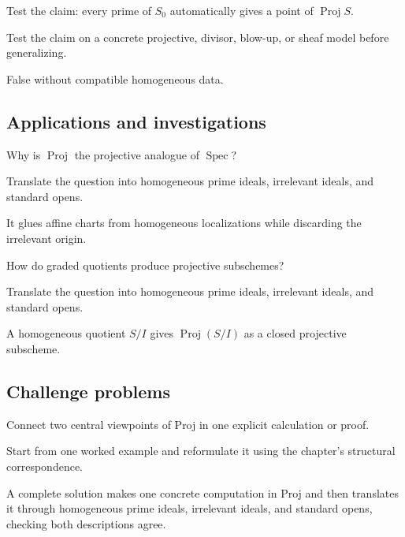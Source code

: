 \begin{exercise}\label{exr:vi35-expand-12}
Test the claim: every prime of $S_0$ automatically gives a point of $\operatorname{Proj}S$.
\end{exercise}
\begin{hint}
Test the claim on a concrete projective, divisor, blow-up, or sheaf model before generalizing.
\end{hint}
\begin{solution}
False without compatible homogeneous data.
\end{solution}

\subsection*{Applications and investigations}

\begin{exercise}\label{exr:vi35-expand-13}
Why is $\operatorname{Proj}$ the projective analogue of $\operatorname{Spec}$?
\end{exercise}
\begin{hint}
Translate the question into homogeneous prime ideals, irrelevant ideals, and standard opens.
\end{hint}
\begin{solution}
It glues affine charts from homogeneous localizations while discarding the irrelevant origin.
\end{solution}

\begin{exercise}[Embeddings]\label{exr:vi35-expand-14}
How do graded quotients produce projective subschemes?
\end{exercise}
\begin{hint}
Translate the question into homogeneous prime ideals, irrelevant ideals, and standard opens.
\end{hint}
\begin{solution}
A homogeneous quotient $S/I$ gives $\operatorname{Proj}(S/I)$ as a closed projective subscheme.
\end{solution}

\subsection*{Challenge problems}

\begin{exercise}\label{exr:vi35-expand-15}
Connect two central viewpoints of Proj in one explicit calculation or proof.
\end{exercise}
\begin{hint}
Start from one worked example and reformulate it using the chapter's structural correspondence.
\end{hint}
\begin{solution}
A complete solution makes one concrete computation in Proj and then translates it through homogeneous prime ideals, irrelevant ideals, and standard opens, checking both descriptions agree.
\end{solution}

